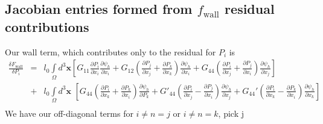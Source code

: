 \documentclass[16pt]{article} %
\begin{document}
\subsection{Jacobian entries formed from $f_\mathrm{wall}$ residual contributions}
%
Our wall term, which contributes only to the residual for $P_i$ is
%
\begin{eqnarray}\nonumber
 \frac{\delta F_\mathrm{wall}}{\delta P_i} &=&l_0 \int\limits_\Omega d^3 {\boldsymbol x} \left[G_{11} \frac{\partial P_i}{\partial x_i} \frac{\partial \psi_h}{\partial x_i} + G_{12} \left(\frac{\partial P_j}{\partial x_j} + \frac{\partial P_k}{\partial x_k} \right) \frac{\partial \psi_h}{\partial x_i} + G_{44} \left(\frac{\partial P_i}{\partial x_j} + \frac{\partial P_j}{\partial x_i} \right)\frac{\partial \psi_h}{\partial x_j} \right]\\ \nonumber
&+&l_0 \int\limits_\Omega d^3 {\boldsymbol x} \,\,\left[ G_{44} \left(\frac{\partial P_i}{\partial x_k} + \frac{\partial P_k}{\partial x_i} \right) \frac{\partial \psi_h}{\partial P_k} + G'_{44} \left(\frac{\partial P_i}{\partial x_j}  - \frac{\partial P_j}{\partial x_i}\right) \frac{\partial \psi_h}{\partial x_j} + G_{44}' \left(\frac{\partial P_i}{\partial x_k} - \frac{\partial P_k}{\partial x_i} \right) \frac{\partial \psi_h}{\partial x_k}\right]\\ \nonumber
\end{eqnarray}
We have our off-diagonal terms for $i \neq n = j$ or $i \neq n = k$, pick j
%
\end{document}
